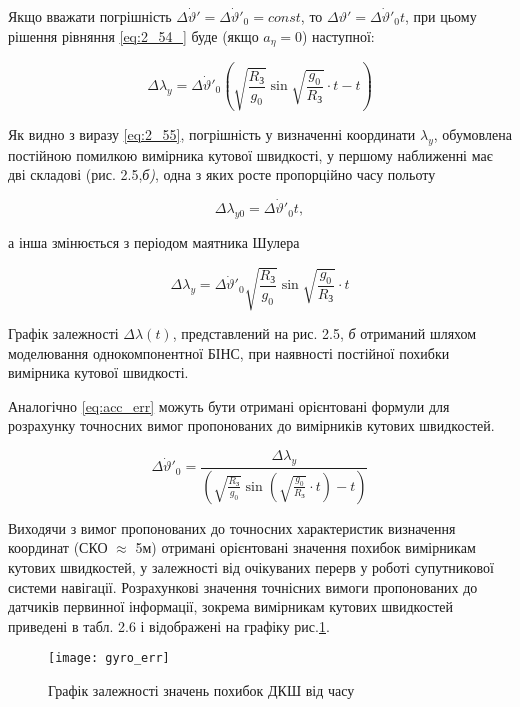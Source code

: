 Якщо вважати погрішність $\Delta \dot{\vartheta }'=\Delta \dot{\vartheta }'_{0} =const$, то $\Delta \vartheta '=\Delta \dot{\vartheta }'_{0} t$, 
при цьому рішення рівняння 
\eqref{eq:2_54_} буде (якщо $a_{\eta } =0$) наступної:

\begin{equation} 
\label{eq:2_55} 
\Delta \lambda _{y} =\Delta \dot{\vartheta }'_{0} \left(\sqrt{\frac{R_{\text{З}} }{g_{0} } } \sin \sqrt{\frac{g_{0} }{R_{\text{З}} } } \cdot t-t\right)
\end{equation} 


Як видно з виразу \eqref{eq:2_55},  погрішність у визначенні координати  $\lambda _{y} $, обумовлена 
постійною  помилкою  вимірника кутової швидкості, у першому наближенні має дві складові (рис. 2.5,\textit{б)}, 
одна  з яких  росте пропорційно  часу польоту

\[\Delta \lambda _{y0} =\Delta \dot{\vartheta }'_{0} t,\] 

а інша  змінюється з періодом маятника Шулера

\[\Delta \lambda _{y} =\Delta \dot{\vartheta }'_{0} \sqrt{\frac{R_{\text{З}} }{g_{0} } } \sin \sqrt{\frac{g_{0} }{R_{\text{З}} } } \cdot t\] 

Графік залежності $\Delta \lambda \left(t\right)$, представлений на рис. 2.5, \textit{б }отриманий 
шляхом моделювання однокомпонентної БІНС, при наявності постійної похибки вимірника кутової швидкості. 

Аналогічно \eqref{eq:acc_err} можуть бути отримані орієнтовані формули для розрахунку точносних вимог 
пропонованих до вимірників кутових швидкостей.

\[\Delta \dot{\vartheta }'_{0} =\frac{\Delta \lambda _{y} }{\left(\sqrt{\frac{R_{{\text{З}}} }{g_{0} } } \sin \left(\sqrt{\frac{g_{0} }{R_{{\text{З}}} } } \cdot t\right)-t\right)} \] 

Виходячи з вимог пропонованих до точносних характеристик визначення координат (СКО $\approx$ 5м) 
отримані орієнтовані значення похибок вимірникам кутових швидкостей, у залежності від очікуваних 
перерв у роботі супутникової системи навігації. Розрахункові значення точнісних вимоги пропонованих 
до датчиків первинної інформації, зокрема вимірникам кутових швидкостей приведені в табл. 2.6 і відображені на графіку рис.\ref{fig:gyro_err}.

\begin{figure}
\centering
\texttt{[image: gyro\_err]}
\caption{Графік залежності значень похибок ДКШ від часу}
\label{fig:gyro_err}
\end{figure} 






